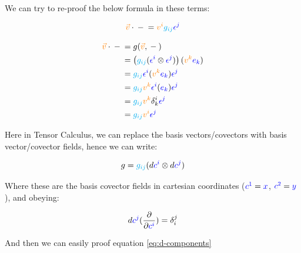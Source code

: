 We can try to re-proof the below formula in these terms:

\begin{equation}
    \begingroup\color{orange}\vec{v}\endgroup \cdot  {{} - {}} = \begingroup\color{orange}v^i\endgroup \begingroup\color{cyan}g_{ij}\endgroup \begingroup\color{blue}\epsilon^j\endgroup
\end{equation}

\begin{align*}
    \begingroup\color{orange}\vec{v}\endgroup \cdot  {{} - {}} &= g(\begingroup\color{orange}\vec{v}\endgroup, {{} - {}})\\
    &= \left(\begingroup\color{cyan}g_{ij}\endgroup 
    (\begingroup\color{blue}\epsilon^i\endgroup \otimes \begingroup\color{blue}\epsilon^j\endgroup)\right)
    (\begingroup\color{orange}v^k\endgroup \begingroup\color{blue}e_k\endgroup)\\
    &= \begingroup\color{cyan}g_{ij}\endgroup \begingroup\color{blue}\epsilon^i\endgroup(\begingroup\color{orange}v^k\endgroup \begingroup\color{blue}e_k\endgroup) \begingroup\color{blue}\epsilon^j\endgroup\\
    &= \begingroup\color{cyan}g_{ij}\endgroup \begingroup\color{orange}v^k\endgroup \begingroup\color{blue}\epsilon^i\endgroup(\begingroup\color{blue}e_k\endgroup) \begingroup\color{blue}\epsilon^j\endgroup\\
    &= \begingroup\color{cyan}g_{ij}\endgroup \begingroup\color{orange}v^k\endgroup \delta^i_k \begingroup\color{blue}\epsilon^j\endgroup\\
    &= \begingroup\color{cyan}g_{ij}\endgroup \begingroup\color{orange}v^i\endgroup\begingroup\color{blue}\epsilon^j\endgroup
\end{align*}

Here in Tensor Calculus, we can replace the basis vectors/covectors with basis vector/covector fields, hence we can write:

\begin{equation}
    g = \begingroup\color{cyan}g_{ij}\endgroup 
    (d\begingroup\color{blue}c^i\endgroup \otimes d\begingroup\color{blue}c^j\endgroup)
\end{equation}

Where these are the basis covector fields in cartesian coordinates ($\begingroup\color{blue}c^1\endgroup = \begingroup\color{blue}x\endgroup$, $\begingroup\color{blue}c^2\endgroup = \begingroup\color{blue}y\endgroup$), and 
obeying:

\begin{equation}
    d\begingroup\color{blue}c^j\endgroup (\frac{\partial}{\partial \begingroup\color{blue}c^i\endgroup}) = \delta^j_i
\end{equation}

And then we can easily proof equation \ref{eq:d-components}